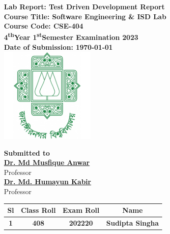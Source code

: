 \documentclass[a4paper,12pt]{article}
\begin{document}
\begin{center}
    \textbf{\large{Lab Report: Test Driven Development Report}}\\
    \vspace{0.2cm}
    \textbf{Course Title: Software Engineering \& ISD Lab}\\
    \vspace{0.2cm}
    \textbf{Course Code: CSE-404}\\
    \vspace{0.2cm}
    \textbf{4\textsuperscript{th}Year 1\textsuperscript{st}Semester Examination 2023}\\
    \vspace{0.5cm}
    \textbf{Date of Submission: \today}\\

    \vspace{1.5cm}
    \includegraphics[width=0.35\textwidth]{images/logo.png}\\ %
    \vspace{1cm}

    \textbf{Submitted to}\\
    \vspace{0.2cm}
    \textbf{\href{https://juniv.edu/teachers/musfique.anwar}{Dr. Md Musfique Anwar}}\\
    {Professor}\\
    \vspace{0.2cm}
    \textbf{\href{https://juniv.edu/teachers/hkabir}{Dr. Md. Humayun Kabir}}\\
    {Professor}\\


    \vspace{1cm}

    \begin{table}[h!]
        \centering
        \begin{tabular}{|c|c|c|c|}
            \hline
            \rowcolor[HTML]{2F4F4F} %
            {\color[HTML]{FFFFFF}\textbf{Sl}}& {\color[HTML]{FFFFFF}\textbf{Class Roll}}& {\color[HTML]{FFFFFF}\textbf{Exam Roll}}& {\color[HTML]{FFFFFF}\textbf{Name}}\\ \hline
            \rowcolor[HTML]{B0E0E6}
            \textbf{1}& \textbf{408} & \textbf{202220} & \textbf{Sudipta Singha} \\ \hline
       

\end{tabular}
\end{table}
\end{center}
\end{document}
